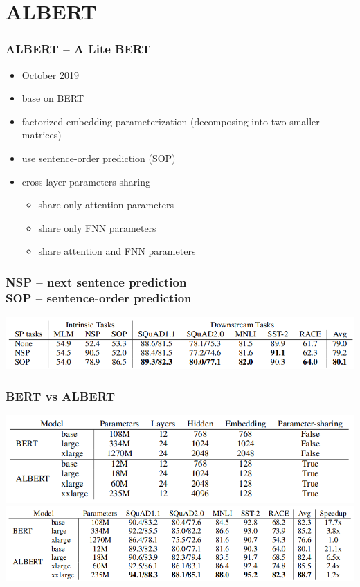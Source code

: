 \documentclass{beamer}
\begin{document}
\section{ALBERT}
\begin{frame}
    \frametitle{ALBERT -- A Lite BERT \cite{albert}}
    \begin{itemize}
        \item October 2019
        \item base on BERT
        \item factorized embedding parameterization (decomposing into two smaller matrices)
        \item use sentence-order prediction (SOP)
        \item cross-layer parameters sharing
        \begin{itemize}
        	\item share only attention parameters
        	\item share only FNN parameters
        	\item share attention and FNN parameters
        \end{itemize}
    \end{itemize}
\end{frame}

\begin{frame}
    \frametitle{NSP -- next sentence prediction\\SOP -- sentence-order prediction}
    \begin{center}
        \includegraphics[scale=1.4]{img/albert-sop.png}
    \end{center}
\end{frame}

\begin{frame}
    \frametitle{BERT vs ALBERT}
    \begin{center}
        \includegraphics[scale=1.4]{img/albert-models.png} \\
        \includegraphics[scale=1.4]{img/albert-score-bert.png}
    \end{center}
\end{frame}
\end{document}
